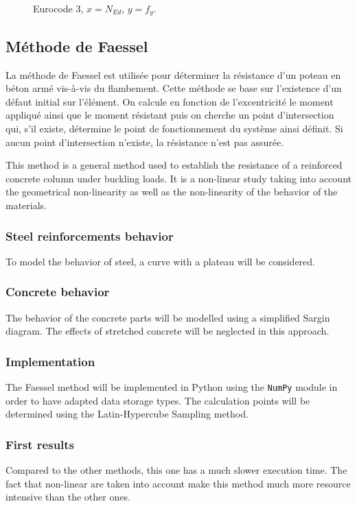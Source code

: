 \documentclass{report}
\begin{document}
\begin{figure}[!ht]
    \centering
    
    \caption{Eurocode 3, $x=N_{Ed}$, $y=f_y$.}\label{fig:res2}
\end{figure}

\subsection{Méthode de Faessel}

La méthode de Faessel est utilisée pour déterminer la résistance d'un poteau en béton armé vis-à-vis du flambement. Cette méthode se base sur l'existence d'un défaut initial sur l'élément. On calcule en fonction de l'excentricité le moment appliqué ainsi que le moment résistant puis on cherche un point d'intersection qui, s'il existe, détermine le point de fonctionnement du système ainsi définit. Si aucun point d'intersection n'existe, la résistance n'est pas assurée.

This method is a general method used to establish the resistance of a reinforced concrete column under buckling loads.
It is a non-linear study  taking into account the geometrical non-linearity as well as the non-linearity of the behavior of the materials.

\subsubsection{Steel reinforcements behavior}
To model the behavior of steel, a curve with a plateau will be considered.

\subsubsection{Concrete behavior}
The behavior of the concrete parts will be modelled using a simplified Sargin diagram.
The effects of stretched concrete will be neglected in this approach.

\subsubsection{Implementation}
The Faessel method will be implemented in Python using the \texttt{NumPy} module in order to have adapted data storage types.
The calculation points will be determined using the Latin-Hypercube Sampling method.

\subsubsection{First results}
Compared to the other methods, this one has a much slower execution time. The fact that non-linear are taken into account make this method much more resource intensive than the other ones.
\end{document}
